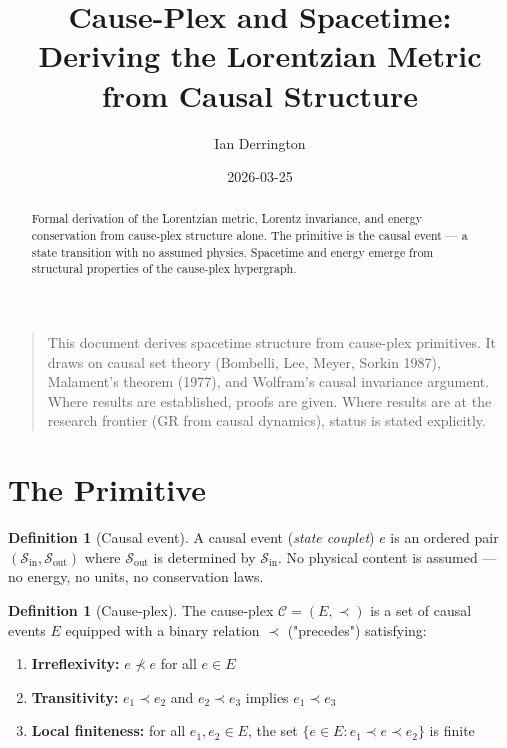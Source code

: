 \documentclass[11pt]{article}
\title{Cause-Plex and Spacetime: Deriving the Lorentzian Metric from Causal Structure}
\author{Ian Derrington}
\date{2026-03-25}
\providecommand{\tightlist}{\setlength{\itemsep}{0pt}\setlength{\parskip}{0pt}}
\theoremstyle{definition}
\newtheorem{definition}[theorem]{Definition}
\theoremstyle{remark}
\begin{document}
\maketitle

\begin{abstract}
Formal derivation of the Lorentzian metric, Lorentz invariance, and energy conservation from cause-plex structure alone. The primitive is the causal event — a state transition with no assumed physics. Spacetime and energy emerge from structural properties of the cause-plex hypergraph.
\end{abstract}

\begin{quote}
This document derives spacetime structure from cause-plex primitives. It
draws on causal set theory (Bombelli, Lee, Meyer, Sorkin 1987),
Malament's theorem (1977), and Wolfram's causal invariance argument.
Where results are established, proofs are given. Where results are at
the research frontier (GR from causal dynamics), status is stated
explicitly.
\end{quote}

\medskip

\section{The Primitive}\label{the-primitive}

\begin{definition}[Causal event]
\label{definition:1-1}
A causal event (\emph{state couplet}) $e$ is an ordered pair $(\mathcal{S}_{\text{in}}, \mathcal{S}_{\text{out}})$ where $\mathcal{S}_{\text{out}}$ is determined by $\mathcal{S}_{\text{in}}$. No physical content is assumed — no energy, no units, no conservation laws.

\end{definition}

\begin{definition}[Cause-plex]
\label{definition:1-2}
The cause-plex $\mathcal{C} = (E, \prec)$ is a set of causal events $E$ equipped with a binary relation $\prec$ ("precedes") satisfying:
\end{definition}

\begin{enumerate}
\def\labelenumi{\arabic{enumi}.}
\tightlist
\item
  \textbf{Irreflexivity:} \(e \not\prec e\) for all \(e \in E\)
\item
  \textbf{Transitivity:} \(e_1 \prec e_2\) and \(e_2 \prec e_3\) implies
  \(e_1 \prec e_3\)
\item
  \textbf{Local finiteness:} for all \(e_1, e_2 \in E\), the set
  \(\{e \in E : e_1 \prec e \prec e_2\}\) is finite
\end{enumerate}
\end{document}
